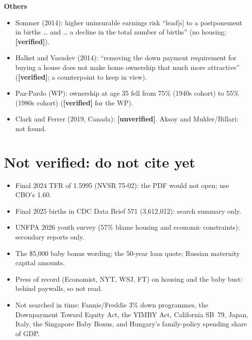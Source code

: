 \documentclass[10pt]{article}
\newcommand{\ok}{\textcolor{green!45!black}{\textbf{[verified]}}}
\newcommand{\unv}{\textcolor{red!70!black}{\textbf{[unverified]}}}
\newcommand{\entry}[5]{%
  \textbf{#1}\par
  \begin{itemize}
    \item #2
    \item #3
    \item #4
    \item #5
  \end{itemize}}
\begin{document}
\entry{Others}
{Sommer (2014): higher uninsurable earnings risk ``lead[s] to a postponement in births \ldots{} and \ldots{} a decline in the total number of births'' (no housing; \ok).}
{Halket and Vasudev (2014): ``removing the down payment requirement for buying a house does not make home ownership that much more attractive'' (\ok; a counterpoint to keep in view).}
{Paz-Pardo (WP): ownership at age 35 fell from 75\% (1940s cohort) to 55\% (1980s cohort) (\ok{} for the WP).}
{Clark and Ferrer (2019, Canada): \unv. Aksoy and Mulder/Billari: not found.}

\section{Not verified: do not cite yet}
\begin{itemize}
  \item Final 2024 TFR of 1.5995 (NVSR 75-02): the PDF would not open; use CBO's 1.60.
  \item Final 2025 births in CDC Data Brief 571 (3,612,012): search summary only.
  \item UNFPA 2026 youth survey (57\% blame housing and economic constraints): secondary reports only.
  \item The \$5,000 baby bonus wording; the 50-year loan quote; Russian maternity capital amounts.
  \item Press of record (Economist, NYT, WSJ, FT) on housing and the baby bust: behind paywalls, so not read.
  \item Not searched in time: Fannie/Freddie 3\% down programmes, the Downpayment Toward Equity Act, the YIMBY Act, California SB~79, Japan, Italy, the Singapore Baby Bonus, and Hungary's family-policy spending share of GDP.
\end{itemize}
\end{document}
